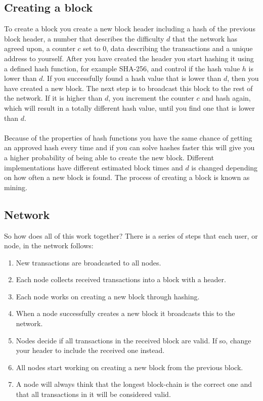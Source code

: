 \documentclass[frame, english]{idamasterthesis}
\begin{document}
\subsection{Creating a block}
To create a block you create a new block header including a hash of the previous block header, a number that describes the difficulty $d$ that the network has agreed upon, a counter $c$ set to $0$, data describing the transactions and a unique address to yourself. After you have created the header you start hashing it using a defined hash function, for example SHA-256, and control if the hash value $h$ is lower than $d$. If you successfully found a hash value that is lower than $d$, then you have created a new block. The next step is to broadcast this block to the rest of the network. If it is higher than $d$, you increment the counter $c$ and hash again, which will result in a totally different hash value, until you find one that is lower than $d$. \\\\
Because of the properties of hash functions you have the same chance of getting an approved hash every time and if you can solve hashes faster this will give you a higher probability of being able to create the new block. Different implementations have different estimated block times and $d$ is changed depending on how often a new block is found. The process of creating a block is known as mining.

\subsection{Network}
So how does all of this work together? There is a series of steps that each user, or node, in the network follows:
\begin{enumerate}
    \item New transactions are broadcasted to all nodes.
    \item Each node collects received transactions into a block with a header.
    \item Each node works on creating a new block through hashing.
    \item When a node successfully creates a new block it broadcasts this to the network.
    \item Nodes decide if all transactions in the received block are valid. If so, change your header to include the received one instead.
    \item All nodes start working on creating a new block from the previous block.
    \item A node will always think that the longest block-chain is the correct one and that all transactions in it will be considered valid.
\end{enumerate}
\end{document}
